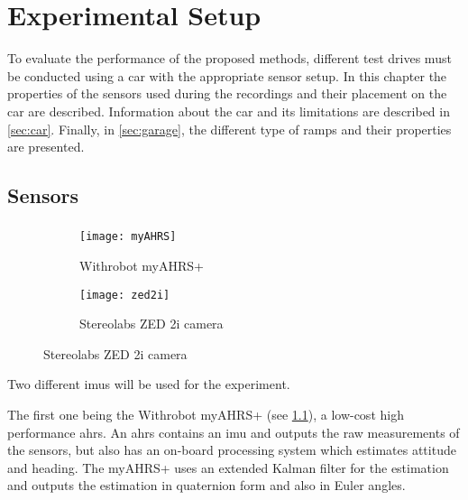 \chapter{Experimental Setup}
\label{ch:ExperimentalSetup}

To evaluate the performance of the proposed methods, different test drives must be conducted using a car with the appropriate sensor setup.
In this chapter the properties of the sensors used during the recordings and their placement on the car are described.
Information about the car and its limitations are described in \cref{sec:car}.
Finally, in \cref{sec:garage}, the different type of ramps and their properties are presented.


\section{Sensors}
\subsection{}
\begin{figure}[htb]
    \centering
    {    \begin{subfigure}[b]{0.45\textwidth}
            \centering
            \texttt{[image: myAHRS]}
            \caption{Withrobot myAHRS+~\cite{Withrobot2017}}
            \label{fig:imu_myahrs}
        \end{subfigure}
        \begin{subfigure}[b]{0.45\textwidth}
            \centering
            \texttt{[image: zed2i]}
            \caption{Stereolabs ZED 2i camera~\cite{Stereolabs2019}}
            \label{fig:imu_zed}
        \end{subfigure}}
\end{figure}
Two different \glspl{imu} will be used for the experiment.

The first one being the Withrobot myAHRS+ (see \cref{fig:imu_myahrs}), a low-cost high performance \gls{ahrs}.
An \gls{ahrs} contains an \gls{imu} and outputs the raw measurements of the sensors, but also has an on-board processing system which estimates attitude and heading.
The myAHRS+ uses an extended Kalman filter for the estimation and outputs the estimation in quaternion form and also in Euler angles.

